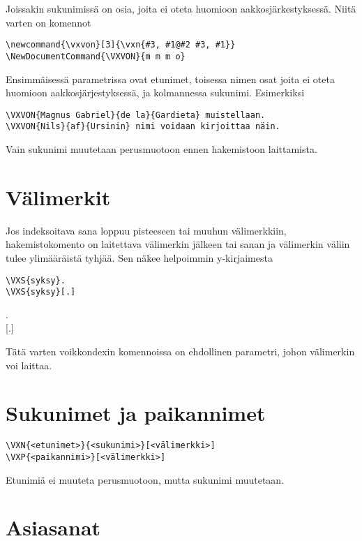 \documentclass[12pt]{article}
\begin{document}
Joissakin sukunimissä on osia, joita ei oteta huomioon
aakkosjärkestyksessä. Niitä varten on komennot

\begin{verbatim}
\newcommand{\vxvon}[3]{\vxn{#3, #1@#2 #3, #1}}
\NewDocumentCommand{\VXVON}{m m m o}
\end{verbatim}

Ensimmäisessä parametrissa ovat etunimet, toisessa nimen osat joita
ei oteta huomioon aakkosjärjestyksessä, ja kolmannessa sukunimi.
Esimerkiksi

\begin{verbatim}
\VXVON{Magnus Gabriel}{de la}{Gardieta} muistellaan.
\VXVON{Nils}{af}{Ursinin} nimi voidaan kirjoittaa näin.
\end{verbatim}

Vain sukunimi muutetaan perusmuotoon ennen hakemistoon laittamista.


\section*{Välimerkit}


Jos indeksoitava sana loppuu pisteeseen tai muuhun välimerkkiin,
hakemistokomento on laitettava välimerkin jälkeen tai sanan ja
välimerkin väliin tulee ylimääräistä tyhjää. Sen näkee helpoimmin
y-kirjaimesta

\begin{verbatim}
\VXS{syksy}.
\VXS{syksy}[.]
\end{verbatim}

\noindent
{}. \\
[.]

Tätä varten voikkondexin komennoissa on ehdollinen parametri, johon
välimerkin voi laittaa.


\section*{Sukunimet ja paikannimet}

\begin{verbatim}
\VXN{<etunimet>}{<sukunimi>}[<välimerkki>]
\VXP{<paikannimi>}[<välimerkki>]
\end{verbatim}

Etunimiä ei muuteta perusmuotoon, mutta sukunimi muutetaan.


\section*{Asiasanat}
\end{document}
